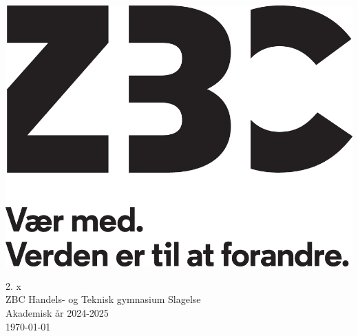 \begin{titlepage}
    \vspace{1cm}

    \includegraphics[width=.7\textwidth]{./assets/zbc_logo_black.jpg}

    \vfill

    2. x \\
    ZBC Handels- og Teknisk gymnasium Slagelse \\
    Akademisk år 2024-2025 \\
    \today
\end{titlepage}